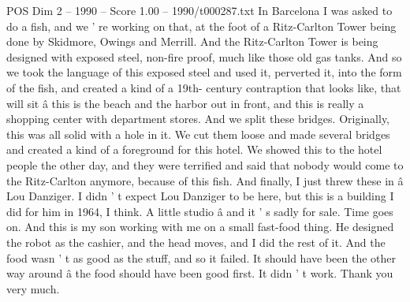 \begin{textsample}{POS Dim 2 – 1990 – Score 1.00 – 1990/t000287.txt}
In Barcelona I was asked to do a fish, and we ' re working on that, at the foot of a Ritz-Carlton Tower being done by Skidmore, Owings and Merrill.
And the Ritz-Carlton Tower is being designed with exposed steel, non-fire proof, much like those old gas tanks.
And so we took the language of this exposed steel and used it, perverted it, into the form of the fish, and created a kind of a 19th- century contraption that looks like, that will sit â this is the beach and the harbor out in front, and this is really a shopping center with department stores.
And we split these bridges.
Originally, this was all solid with a hole in it.
We cut them loose and made several bridges and created a kind of a foreground for this hotel.
We showed this to the hotel people the other day, and they were terrified and said that nobody would come to the Ritz-Carlton anymore, because of this fish.
And finally, I just threw these in â Lou Danziger.
I didn ' t expect Lou Danziger to be here, but this is a building I did for him in 1964, I think.
A little studio â and it ' s sadly for sale.
Time goes on.
And this is my son working with me on a small fast-food thing.
He designed the robot as the cashier, and the head moves, and I did the rest of it.
And the food wasn ' t as good as the stuff, and so it failed.
It should have been the other way around â the food should have been good first.
It didn ' t work.
Thank you very much.

\end{textsample}

